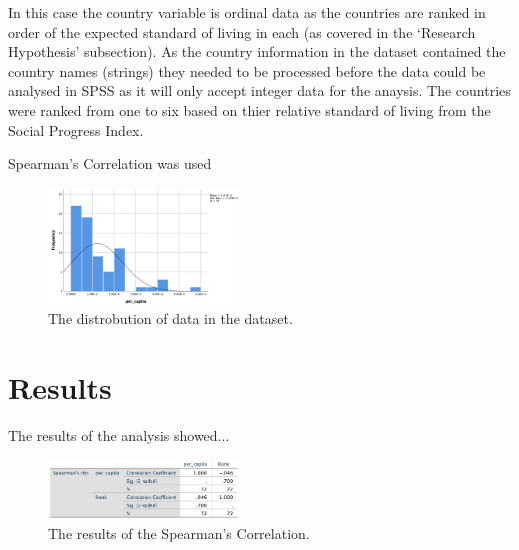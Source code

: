 \documentclass[conference]{IEEEtran}
\begin{document}
In this case the country variable is ordinal data as the countries are ranked in order of the expected standard of living in each (as covered in the `Research Hypothesis' subsection).
As the country information in the dataset contained the country names (strings) they needed to be processed before the data could be analysed in SPSS as it will only accept integer data for the anaysis.
The countries were ranked from one to six based on thier relative standard of living from the Social Progress Index.

Spearman's Correlation was used 

    \begin{figure}[b]
        \centering
        \includegraphics[width=0.45\textwidth]{skewed}
        \caption{The distrobution of data in the dataset.}
    \end{figure}

\section{Results}
The results of the analysis showed...
\newline

\begin{figure}[b]
    \centering
    \includegraphics[width=0.45\textwidth]{spearmans}
    \caption{The results of the Spearman's Correlation.}
\end{figure}
\end{document}
